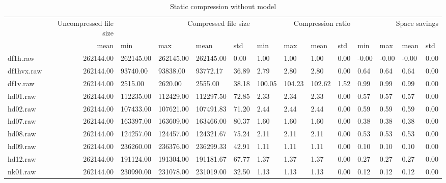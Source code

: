 \begin{table}
\caption{Static compression without model}
\begin{tabular}{lrllllllllllll}
 & Uncompressed file size & \multicolumn{4}{r}{Compressed file size} & \multicolumn{4}{r}{Compression ratio} & \multicolumn{4}{r}{Space savings} \\
 & mean & min & max & mean & std & min & max & mean & std & min & max & mean & std \\
df1h.raw & 262144.00 & 262145.00 & 262145.00 & 262145.00 & 0.00 & 1.00 & 1.00 & 1.00 & 0.00 & -0.00 & -0.00 & -0.00 & 0.00 \\
df1hvx.raw & 262144.00 & 93740.00 & 93838.00 & 93772.17 & 36.89 & 2.79 & 2.80 & 2.80 & 0.00 & 0.64 & 0.64 & 0.64 & 0.00 \\
df1v.raw & 262144.00 & 2515.00 & 2620.00 & 2555.00 & 38.18 & 100.05 & 104.23 & 102.62 & 1.52 & 0.99 & 0.99 & 0.99 & 0.00 \\
hd01.raw & 262144.00 & 112235.00 & 112429.00 & 112297.50 & 72.85 & 2.33 & 2.34 & 2.33 & 0.00 & 0.57 & 0.57 & 0.57 & 0.00 \\
hd02.raw & 262144.00 & 107433.00 & 107621.00 & 107491.83 & 71.20 & 2.44 & 2.44 & 2.44 & 0.00 & 0.59 & 0.59 & 0.59 & 0.00 \\
hd07.raw & 262144.00 & 163397.00 & 163609.00 & 163466.00 & 80.37 & 1.60 & 1.60 & 1.60 & 0.00 & 0.38 & 0.38 & 0.38 & 0.00 \\
hd08.raw & 262144.00 & 124257.00 & 124457.00 & 124321.67 & 75.24 & 2.11 & 2.11 & 2.11 & 0.00 & 0.53 & 0.53 & 0.53 & 0.00 \\
hd09.raw & 262144.00 & 236260.00 & 236376.00 & 236299.33 & 42.91 & 1.11 & 1.11 & 1.11 & 0.00 & 0.10 & 0.10 & 0.10 & 0.00 \\
hd12.raw & 262144.00 & 191124.00 & 191304.00 & 191181.67 & 67.77 & 1.37 & 1.37 & 1.37 & 0.00 & 0.27 & 0.27 & 0.27 & 0.00 \\
nk01.raw & 262144.00 & 230990.00 & 231078.00 & 231019.00 & 32.50 & 1.13 & 1.13 & 1.13 & 0.00 & 0.12 & 0.12 & 0.12 & 0.00 \\
\end{tabular}
\end{table}
